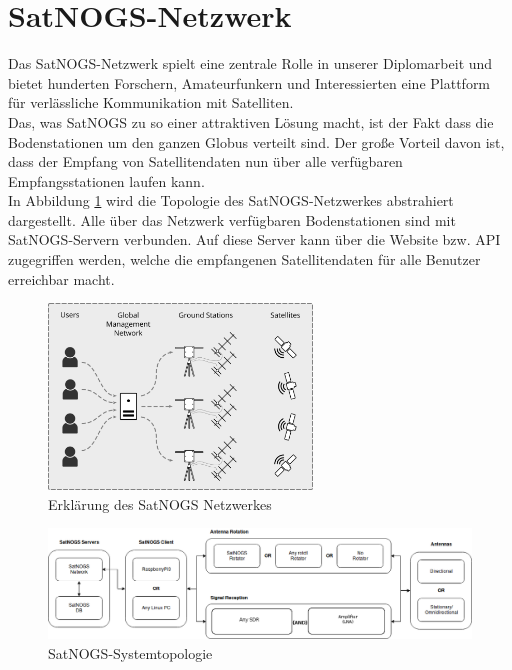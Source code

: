 \section{SatNOGS-Netzwerk}
\label{sec:sat}
Das SatNOGS-Netzwerk spielt eine zentrale Rolle in unserer Diplomarbeit und bietet hunderten Forschern, Amateurfunkern und Interessierten eine Plattform für verlässliche Kommunikation mit Satelliten.\\

Das, was SatNOGS zu so einer attraktiven Lösung macht, ist der Fakt dass die Bodenstationen um den ganzen Globus verteilt sind. Der große Vorteil davon ist, dass der Empfang von Satellitendaten nun über alle verfügbaren Empfangsstationen laufen kann.\\

In Abbildung \ref{fig:SatNOGS_Erklärung} wird die Topologie des SatNOGS-Netzwerkes abstrahiert dargestellt.
Alle über das Netzwerk verfügbaren Bodenstationen sind mit SatNOGS-Servern verbunden. Auf diese Server kann über die Website bzw. API zugegriffen werden, welche die empfangenen Satellitendaten für alle Benutzer erreichbar macht.

\begin{figure}[h!]
	\centering
	\includegraphics[width=7cm]{../ref/SatNOGS_explanation}
	\caption{Erklärung des SatNOGS Netzwerkes \cite{noauthor_satnogs_explanationpng_nodate}}
	\label{fig:SatNOGS_Erklärung}
\end{figure}	

\begin{figure}[h!]
	\centering
	\includegraphics[width=\textwidth]{../ref/SatNOGS_BlockDiagram}
	\caption{SatNOGS-Systemtopologie \cite{bent_so_2017}}
	\label{fig:SatNOGS_Systemtopologie}
\end{figure}

